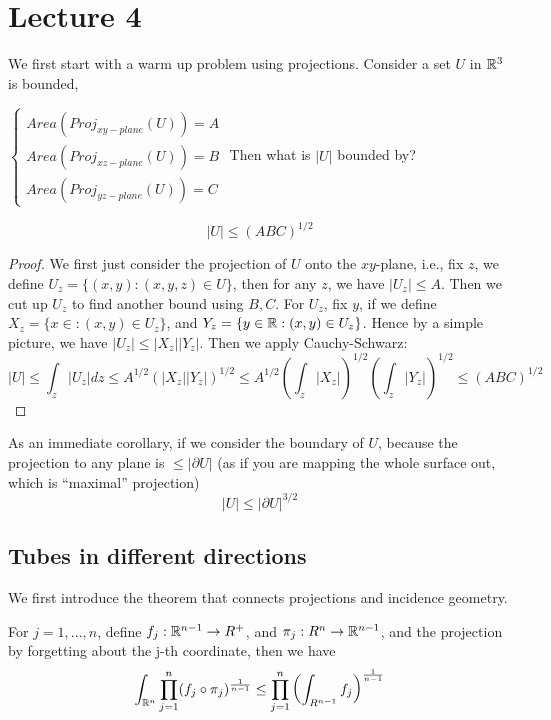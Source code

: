 \section*{Lecture 4}

We first start with a warm up problem using projections. Consider a set $U$ in $\mathbb{R}^3$ is bounded,

$\begin{cases}
    Area(Proj_{xy-plane}(U))=A\\
    Area(Proj_{xz-plane}(U))=B\\
    Area(Proj_{yz-plane}(U))=C
\end{cases}$
Then what is $|U|$ bounded by?
\begin{proposition}
    \begin{equation*}
        |U|\leq (ABC)^{1/2}
    \end{equation*}
\end{proposition}
\begin{proof}
    We first just consider the projection of $U$ onto the $xy$-plane, i.e., fix $z$, we define $U_z=\{(x,y):(x,y,z)\in U\}$, then for any $z$, we have $|U_z|\leq A$. Then we cut up $U_z$ to find another bound using $B,C$. For $U_z$, fix $y$, if we define $X_z=\{x\in: (x,y)\in U_z\}$, and $Y_z=\{y\in\mathbb{R}: (x,y)\in U_z\}$. Hence by a simple picture, we have $|U_z|\leq|X_z||Y_z|$. Then we apply Cauchy-Schwarz:
    \begin{equation*}
        |U|\leq\int_z|U_z|dz\leq A^{1/2}(|X_z||Y_z|)^{1/2}\leq A^{1/2}\left(\int_z|X_z| \right)^{1/2}\left(\int_z|Y_z| \right)^{1/2}\leq(ABC)^{1/2}
    \end{equation*}
\end{proof}
As an immediate corollary, if we consider the boundary of $U$, because the projection to any plane is $\leq |\partial U|$ (as if you are mapping the whole surface out, which is ``maximal'' projection)
\begin{equation*}
    |U|\leq |\partial U|^{3/2}
\end{equation*}

\subsection{Tubes in different directions}
We first introduce the theorem that connects projections and incidence geometry.
\begin{theorem}
    For $j=1,..., n$, define $f_j:\mathbb{R}^{n-1}\to R^+$, and $\pi_j: R^n\to\mathbb{R}^{n-1}$, and the projection by forgetting about the j-th coordinate, then we have
    \begin{equation*}
        \int_{\mathbb{R}^n}\prod_{j=1}^n(f_j\circ\pi_j)^{\frac{1}{n-1}}\leq\prod_{j=1}^n\left(\int_{R^{n-1}}f_j\right)^{\frac{1}{n-1}}
    \end{equation*}
\end{theorem}

